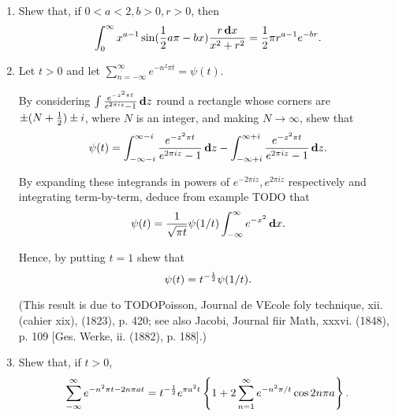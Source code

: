 \begin{enumerate}
%
\item
  Shew that, if $0 < a < 2, b > 0, r > 0$, then
  $$
  \int_{0}^{\infty}
  x^{a-1}
  \sin (\frac{1}{2} a\pi - bx )
  \frac{r \, \mathbf{d} x}{x^{2} + r^{2}}
  =
  \frac{1}{2} \pi r^{a-1} e^{-br}.
  $$
%
%

\item
  Let $t>0$ and let
  $
  \sum_{n=-\infty}^{\infty}
  e^{-n^{2} \pi t}
  =
  \psi(t).
  $

  By considering
  $
  \int \frac{e^{-z^{2} \pi t}}{e^{2\pi i z} - 1} \, \mathbf{d} z
  $
  round a rectangle whose corners are
  $\pm (N+\frac{1}{2}) \pm i$, where $N$ is an integer,
  and making $N \rightarrow \infty$, shew that
  $$
  \psi(t)
  =
  \int_{-\infty - i}^{\infty - i}
  \frac{e^{-z^{2} \pi t}}{e^{2\pi i z} - 1} \, \mathbf{d} z
  -
  \int_{-\infty + i}^{\infty + i}
  \frac{e^{-z^{2} \pi t}}{e^{2\pi i z} - 1} \, \mathbf{d} z.
  $$

  By expanding these integrands in powers of
  $e^{-2\pi i z}, e^{2\pi i z}$
  respectively
  and integrating term-by-term, deduce from example TODO that
  $$
  \psi(t)
  =
  \frac{1}{ \sqrt{\pi t} }
  \psi(1/t)
  \int_{-\infty}^{\infty} e^{-x^{2}} \, \mathbf{d} x.
  $$

  Hence, by putting $t = 1$ shew that
  $$
  \psi(t) = t^{-\frac{1}{2}} \psi(1/t).
  $$

  (This result is due to TODOPoisson, Journal de VEcole foly technique, xii.
  (cahier xix), (1823), p. 420; see also Jacobi, Journal fiir Math,
  xxxvi. (1848), p. 109 [Ges. Werke, ii. (1882), p. 188].)

\item
  Shew that, if $t>0$,
  $$
  \sum_{-\infty}^{\infty}
  e^{-n^{2} \pi t - 2 n \pi a t}
  =
  t^{-\frac{1}{2}}
  e^{\pi a^{2} t}
  \left\{ 
    1
    +
    2
    \sum_{n=1}^{\infty}
    e^{-n^{2} \pi / t} \cos 2n\pi a
   \right\}.
  $$

\end{enumerate}